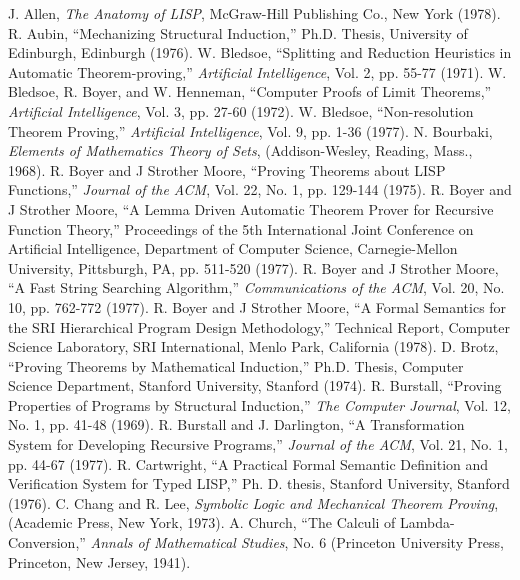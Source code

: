 \documentclass[10pt]{book}
\begin{document}
\begin{thebibliography}{99}
 J. Allen, \emph{The Anatomy of LISP}, McGraw-Hill Publishing Co., New York (1978).
 R. Aubin, ``Mechanizing Structural Induction,'' Ph.D. Thesis, University of Edinburgh, Edinburgh (1976).
 W. Bledsoe, ``Splitting and Reduction Heuristics in Automatic Theorem-proving,'' \emph{Artificial Intelligence}, Vol. 2, pp. 55-77 (1971).
 W. Bledsoe, R. Boyer, and W. Henneman,  ``Computer Proofs of Limit Theorems,'' \emph{Artificial Intelligence}, Vol. 3, pp. 27-60 (1972).
 W. Bledsoe, ``Non-resolution Theorem Proving,'' \emph{Artificial Intelligence}, Vol. 9, pp. 1-36 (1977).
 N. Bourbaki, \emph{Elements of Mathematics Theory of Sets}, (Addison-Wesley, Reading, Mass., 1968).
 R. Boyer and J Strother Moore, ``Proving Theorems about LISP Functions,'' \emph{Journal of the ACM}, Vol. 22, No. 1, pp. 129-144 (1975).
 R. Boyer and J Strother Moore, ``A Lemma Driven Automatic Theorem Prover for Recursive Function Theory,'' Proceedings of the 5th International Joint Conference on Artificial Intelligence, Department of Computer Science, Carnegie-Mellon University, Pittsburgh, PA, pp. 511-520 (1977).
 R. Boyer and J Strother Moore, ``A Fast String Searching Algorithm,'' \emph{Communications of the ACM}, Vol. 20, No. 10, pp. 762-772 (1977).
 R. Boyer and J Strother Moore, ``A Formal Semantics for the SRI Hierarchical Program Design Methodology,'' Technical Report, Computer Science Laboratory, SRI International, Menlo Park, California (1978).
 D. Brotz, ``Proving Theorems by Mathematical Induction,'' Ph.D. Thesis, Computer Science Department, Stanford University, Stanford (1974).
 R.  Burstall, ``Proving Properties of Programs by Structural Induction,'' \emph{The Computer Journal}, Vol. 12, No. 1, pp. 41-48 (1969).
 R. Burstall and J. Darlington, ``A Transformation System for Developing Recursive Programs,'' \emph{Journal of the ACM}, Vol. 21, No. 1, pp. 44-67 (1977).
 R. Cartwright, ``A Practical Formal Semantic Definition and Verification System for Typed LISP,'' Ph. D. thesis, Stanford University, Stanford (1976).
 C. Chang and R. Lee, \emph{Symbolic Logic and Mechanical Theorem Proving}, (Academic Press, New York, 1973).
 A. Church, ``The Calculi of Lambda-Conversion,'' \emph{Annals of Mathematical Studies}, No. 6 (Princeton University Press, Princeton, New Jersey, 1941).

\end{thebibliography}
\end{document}
